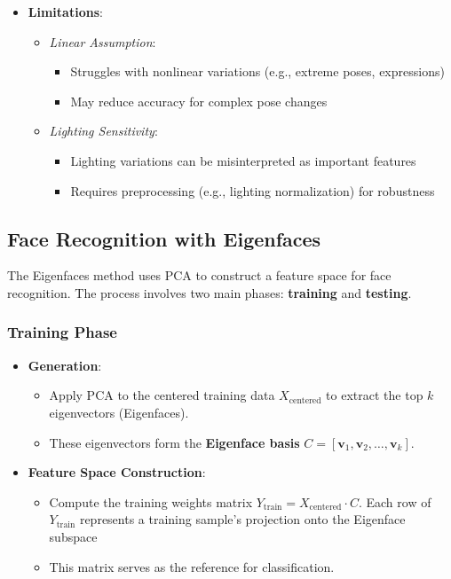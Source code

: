 \documentclass{article}
\begin{document}
\begin{itemize}
		\item \textbf{Limitations}:
		\begin{itemize}
			\item \textit{Linear Assumption}\cite{Hastie2009}:
			\begin{itemize}
				\item Struggles with nonlinear variations (e.g., extreme poses, expressions)
				\item May reduce accuracy for complex pose changes
			\end{itemize}
			\item \textit{Lighting Sensitivity}:
			\begin{itemize}
				\item Lighting variations can be misinterpreted as important features
				\item Requires preprocessing (e.g., lighting normalization) for robustness
			\end{itemize}
		\end{itemize}
	\end{itemize}
	
	\subsection{Face Recognition with Eigenfaces}
	The Eigenfaces method uses PCA to construct a feature space for face recognition. The process involves two main phases: \textbf{training} and \textbf{testing}.
	
	\subsubsection{Training Phase}
	\begin{itemize}
		\item \textbf{ Generation}:
		\begin{itemize}
			\item Apply PCA to the centered training data \(X_{\text{centered}}\) to extract the top \(k\) eigenvectors (Eigenfaces).
			\item These eigenvectors form the \textbf{Eigenface basis} \(C = [\mathbf{v}_1, \mathbf{v}_2, \dots, \mathbf{v}_k]\).
		\end{itemize}
		
		\item \textbf{Feature Space Construction}:
		\begin{itemize}
			\item Compute the training weights matrix \(Y_{\text{train}} = X_{\text{centered}} \cdot C\). Each row of \(Y_{\text{train}}\) represents a training sample's projection onto the Eigenface subspace
			\item This matrix serves as the reference for classification.
		\end{itemize}
	\end{itemize}
		
\end{document}
